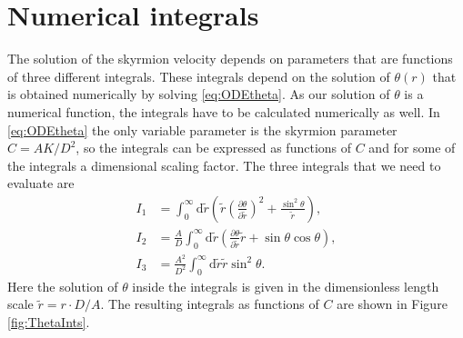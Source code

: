 \section{Numerical integrals}
The solution of the skyrmion velocity depends on parameters that are functions of three different integrals. These integrals depend on the solution of $\theta(r)$ that is obtained numerically by solving \eqref{eq:ODEtheta}. As our solution of $\theta$ is a numerical function, the integrals have to be calculated numerically as well. In \eqref{eq:ODEtheta} the only variable parameter is the skyrmion parameter $C = AK/D^2$, so the integrals can be expressed as functions of $C$ and for some of the integrals a dimensional scaling factor. The three integrals that we need to evaluate are
\begin{subequations}
\begin{align}
I_1 &= \int_0^{\infty} \textrm{d} \tilde{r} \left(\tilde{r}\left(\frac{\partial \theta}{\partial \tilde{r}}\right)^2+\frac{\sin^2\theta}{\tilde{r}}\right), \\
I_2 &= \frac{A}{D} \int_0^{\infty} \textrm{d} \tilde{r} \left(\frac{\partial \theta}{\partial \tilde{r}} \tilde{r} + \sin\theta\cos\theta \right), \\
I_3 &= \frac{A^2}{D^2}\int_0^{\infty} \textrm{d} \tilde{r} \tilde{r}\sin^2\theta.
\end{align}
\end{subequations}
Here the solution of $\theta$ inside the integrals is given in the dimensionless length scale $\tilde{r} = r\cdot D/A$. The resulting integrals as functions of $C$ are shown in Figure \ref{fig:ThetaInts}.
